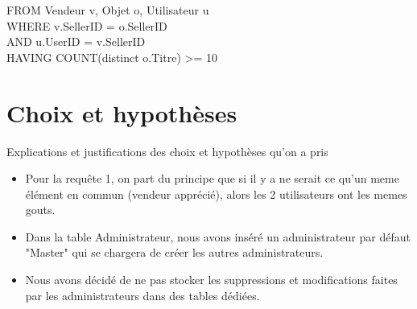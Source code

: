 \documentclass[a4paper,11pt]{article}
\begin{document}
FROM Vendeur v, Objet o, Utilisateur u\\
WHERE v.SellerID = o.SellerID\\
AND u.UserID = v.SellerID\\
HAVING COUNT(distinct o.Titre) >= 10


\section{Choix et hypothèses}

Explications et justifications des choix et hypothèses qu'on a pris

\begin{itemize}
	\item Pour la requête 1, on part du principe que si il y a ne serait ce qu'un meme élément en commun (vendeur apprécié), alors les 2 utilisateurs ont les memes gouts.
    \item Dans la table Administrateur, nous avons inséré un administrateur par défaut "Master" qui se chargera de créer les autres administrateurs.
    \item Nous avons décidé de ne pas stocker les suppressions et modifications faites par les administrateurs dans des tables dédiées.
   
    
\end{itemize}
\end{document}
